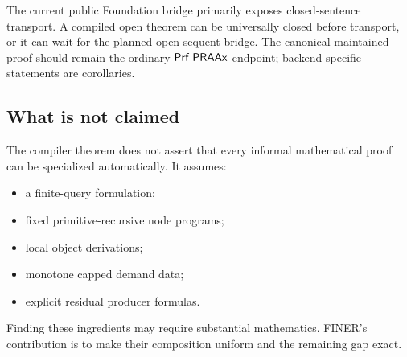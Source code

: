 The current public Foundation bridge primarily exposes closed-sentence transport.  A compiled open theorem can be universally closed before transport, or it can wait for the planned open-sequent bridge.  The canonical maintained proof should remain the ordinary \(\mathsf{Prf}\;\mathsf{PRAAx}\) endpoint; backend-specific statements are corollaries.

\subsection{What is not claimed}

The compiler theorem does not assert that every informal mathematical proof can be specialized automatically.  It assumes:
\begin{itemize}[leftmargin=2em]
\item a finite-query formulation;
\item fixed primitive-recursive node programs;
\item local object derivations;
\item monotone capped demand data;
\item explicit residual producer formulas.
\end{itemize}
Finding these ingredients may require substantial mathematics.  FINER's contribution is to make their composition uniform and the remaining gap exact.
